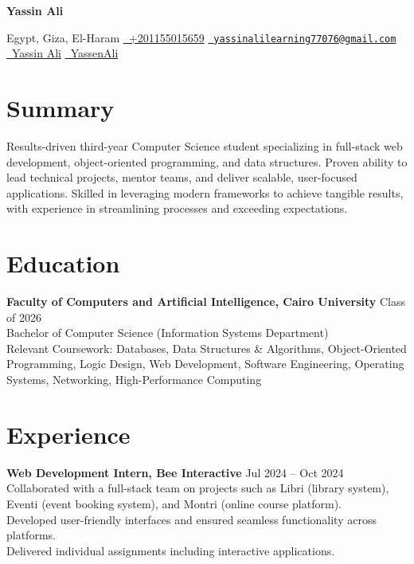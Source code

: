 \documentclass[a4paper,10pt]{article}
\begin{document}
\centerline{\Huge \textbf{Yassin Ali}}
\vspace{2mm}
\centerline{
  Egypt, Giza, El-Haram \textbullet{}
  \href{tel:+201155015659}{\faPhone\ +201155015659} \textbullet{}
  \href{mailto:yassinalilearning77076@gmail.com}{\faEnvelope\ \texttt{yassinalilearning77076@gmail.com}} \textbullet{}
  \href{https://www.linkedin.com/in/yassin-ali-10497a252/}{\faLinkedinSquare\ Yassin Ali} \textbullet{}
  \href{https://github.com/YassenAli}{\faGithub\ YassenAli}
}


\section*{Summary}
Results-driven third-year Computer Science student specializing in full-stack web development, object-oriented programming, and data structures. Proven ability to lead technical projects, mentor teams, and deliver scalable, user-focused applications. Skilled in leveraging modern frameworks to achieve tangible results, with experience in streamlining processes and exceeding expectations.


\section*{Education}
\textbf{Faculty of Computers and Artificial Intelligence, Cairo University} \hfill Class of 2026 \\
Bachelor of Computer Science (Information Systems Department) \\
Relevant Coursework: Databases, Data Structures \& Algorithms, Object-Oriented Programming, Logic Design, Web Development, Software Engineering, Operating Systems, Networking, High-Performance Computing


\section*{Experience}
\textbf{Web Development Intern, Bee Interactive} \hfill Jul 2024 -- Oct 2024 \\
\textbullet{}\hspace{2mm} Collaborated with a full-stack team on projects such as Libri (library system), Eventi (event booking system), and Montri (online course platform).  \\
\textbullet{}\hspace{2mm} Developed user-friendly interfaces and ensured seamless functionality across platforms.  \\
\textbullet{}\hspace{2mm} Delivered individual assignments including interactive applications.
\end{document}
